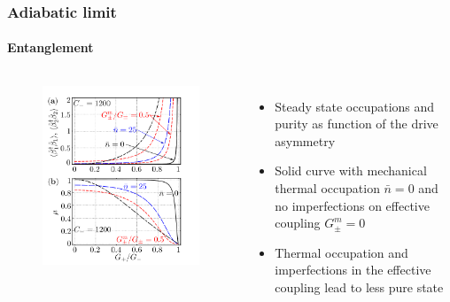 \documentclass[aspectratio=43]{beamer}
\begin{document}
\begin{frame}
	
	\frametitle{Adiabatic limit}
	\framesubtitle{Entanglement}
	
	\begin{columns}
		
		
		\begin{figure}
			\includegraphics[width = 6 cm]{plots/plot_steady_state.png}
		\end{figure}	
		
		
		\begin{itemize}
			\item Steady state occupations and purity as function of the drive asymmetry
			\item Solid curve with mechanical thermal occupation $\bar{n} = 0$ and no imperfections on effective coupling $G^{m}_{\pm} = 0$
			\item Thermal occupation and imperfections in the effective coupling lead to less 
			pure state
		\end{itemize}
		
	\end{columns}

\end{frame}
\end{document}

